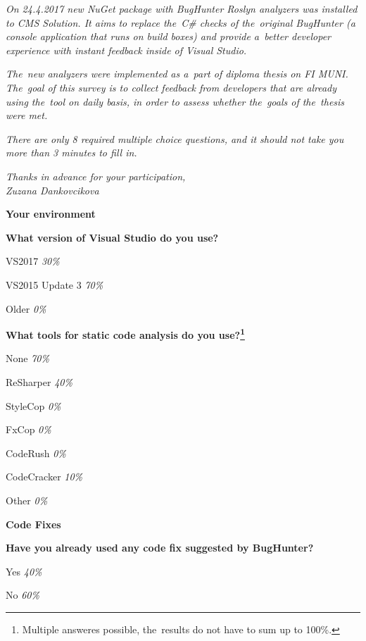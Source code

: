 \documentclass[
  digital, %
  table,   %
  lof,     %
  lot,     %
  oneside,
]{fithesis3}
\begin{document}
\bigskip\noindent
\textit{On 24.4.2017 new NuGet package with BugHunter Roslyn analyzers was installed to CMS Solution. It aims to replace the~C\# checks of the~original BugHunter (a console application that runs on build boxes) and provide a~better developer experience with instant feedback inside of Visual Studio.}

\textit{The~new analyzers were implemented as a~part of diploma thesis on FI MUNI. The~goal of this survey is to collect feedback from developers that are already using the~tool on daily basis, in order to assess whether the~goals of the~thesis were met.}

\textit{There are only 8 required multiple choice questions, and it should not take you more than 3 minutes to fill in.}

\bigskip\noindent
\textit{Thanks in advance for your participation,}
\\ \noindent
\textit{Zuzana Dankovcikova}

\begin{center}
\textbf{Your environment}
\end{center}

\smallskip\noindent
\textbf{What version of Visual Studio do you use?}
\begin{compactitem}
\item VS2017 \textit{30\%}
\item VS2015 Update 3 \textit{70\%}
\item Older \textit{0\%}
\end{compactitem}

\smallskip\noindent
\textbf{What tools for static code analysis do you use?\footnote{Multiple answeres possible, the~results do not have to sum up to 100\%.}}
\begin{compactitem}
\item None \textit{70\%}
\item ReSharper \textit{40\%}
\item StyleCop \textit{0\%}
\item FxCop \textit{0\%}
\item CodeRush \textit{0\%}
\item CodeCracker \textit{10\%}
\item Other \textit{0\%}
\end{compactitem}

\begin{center}
\textbf{Code Fixes}
\end{center}

\smallskip\noindent
\textbf{Have you already used any code fix suggested by BugHunter?}
\begin{compactitem}
\item Yes \textit{40\%}
\item No \textit{60\%}
\end{compactitem}
\end{document}
